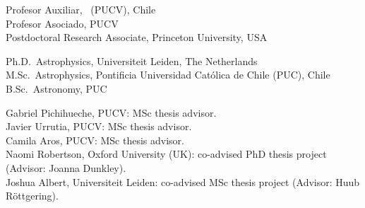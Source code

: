 \documentclass[11pt]{article}
\begin{document}

\noindent
{} Profesor Auxiliar, \pucv\ (PUCV), Chile\\
 Profesor Asociado, PUCV\\
 Postdoctoral Research Associate, Princeton University, USA



\noindent
{} Ph.D.~Astrophysics, Universiteit Leiden, The Netherlands\\
 M.Sc.~Astrophysics, Pontificia Universidad Cat\'olica de Chile (PUC), Chile\\
 B.Sc.~Astronomy, PUC\\







\noindent
{} Gabriel Pichihueche, PUCV: MSc thesis advisor.\\
 Javier Urrutia, PUCV: MSc thesis advisor.\\
 Camila Aros, PUCV: MSc thesis advisor.\\
 Naomi Robertson, Oxford University (UK): co-advised PhD thesis project (Advisor: Joanna Dunkley).\\
 Joshua Albert, Universiteit Leiden: co-advised MSc thesis project (Advisor: Huub R\"ottgering). 

\end{document}
